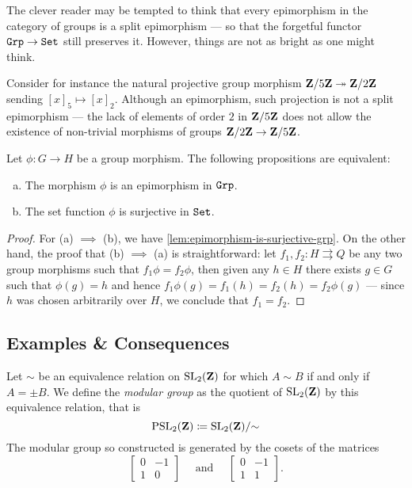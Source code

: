 \begin{remark}
\label{rem:not-every-grp-epi-is-split}
The clever reader may be tempted to think that every epimorphism in the category
of groups is a split epimorphism --- so that the forgetful functor
\({\texttt{Grp}} \to {\texttt{Set}}\) still preserves it. However, things are not as bright as one
might think.

Consider for instance the natural projective group morphism
\(\mathbf{Z}/5\mathbf{Z} \twoheadrightarrow \mathbf{Z}/2\mathbf{Z}\) sending \([x]_5 \mapsto [x]_2\). Although an epimorphism,
such projection is not a split epimorphism --- the lack of elements of order
\(2\) in \(\mathbf{Z}/5\mathbf{Z}\) does not allow the existence of non-trivial morphisms of
groups \(\mathbf{Z}/2\mathbf{Z} \to \mathbf{Z}/5\mathbf{Z}\).
\end{remark}

\begin{proposition}
\label{prop:epic-in-grp}
Let \(\phi: G \to H\) be a group morphism. The following propositions are
equivalent:
\begin{enumerate}[(a)]\setlength\itemsep{0em}
\item The morphism \(\phi\) is an epimorphism in \({\texttt{Grp}}\).
\item The set function \(\phi\) is surjective in \({\texttt{Set}}\).
\end{enumerate}
\end{proposition}

\begin{proof}
For (a) \(\implies\) (b), we have \cref{lem:epimorphism-is-surjective-grp}. On
the other hand, the proof that (b) \(\implies\) (a) is straightforward: let
\(f_1, f_2: H \rightrightarrows Q\) be any two group morphisms such that
\(f_1 \phi = f_2 \phi\), then given any \(h \in H\) there exists \(g \in G\)
such that \(\phi(g) = h\) and hence \(f_1\phi(g) = f_1(h) = f_2(h) = f_2
\phi(g)\) --- since \(h\) was chosen arbitrarily over \(H\), we conclude that
\(f_1 = f_2\).
\end{proof}

\subsection{Examples \& Consequences}

\begin{proposition}
\label{prop:PSL_2(Z)-generators}
Let \(\sim\) be an equivalence relation on \(\operatorname{SL}_2(\mathbf{Z})\) for which \(A \sim B\)
if and only if \(A = \pm B\). We define the \emph{modular group} as the quotient
of \(\operatorname{SL}_2(\mathbf{Z})\) by this equivalence relation, that is
\[
\operatorname{PSL}_2(\mathbf{Z}) \coloneq \operatorname{SL}_2(\mathbf{Z})/{\sim}
\]
The modular group so constructed is generated by the cosets of the matrices
\[
\begin{bmatrix}
  0 & -1 \\ 1 & 0
\end{bmatrix}
\quad
\text{ and }
\quad
\begin{bmatrix}
  0 & -1 \\ 1 & 1
\end{bmatrix}.
\]
\end{proposition}

